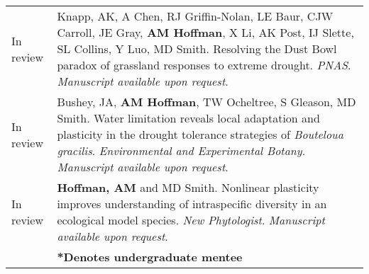 \documentclass[letterpaper]{deedy-resume} %
\begin{document}
\begin{tabular}{>{\raggedleft\arraybackslash}p{2cm}p{16cm}}



In review & Knapp, AK, A Chen, RJ Griffin-Nolan, LE Baur, CJW Carroll, JE Gray, \textbf{AM Hoffman}, X Li, AK Post, IJ Slette, SL Collins, Y Luo, MD Smith. Resolving the Dust Bowl paradox of grassland responses to extreme drought. \textcolor{special}{\textit{PNAS}}. \textit{Manuscript available upon request}.\\

In review & Bushey, JA, \textbf{AM Hoffman}, TW Ocheltree, S Gleason, MD Smith. Water limitation reveals local adaptation and plasticity in the drought tolerance strategies of \textit{Bouteloua gracilis}. \textcolor{special}{\textit{Environmental and Experimental Botany}}. \textit{Manuscript available upon request}.\\

In review & \textbf{Hoffman, AM} and MD Smith. Nonlinear plasticity improves understanding of intraspecific diversity in an ecological model species. \textcolor{special}{\textit{New Phytologist}}. \textit{Manuscript available upon request}.\\

&\textbf{*Denotes undergraduate mentee}\\

\end{tabular}
\sectionspace


%
\end{document}
